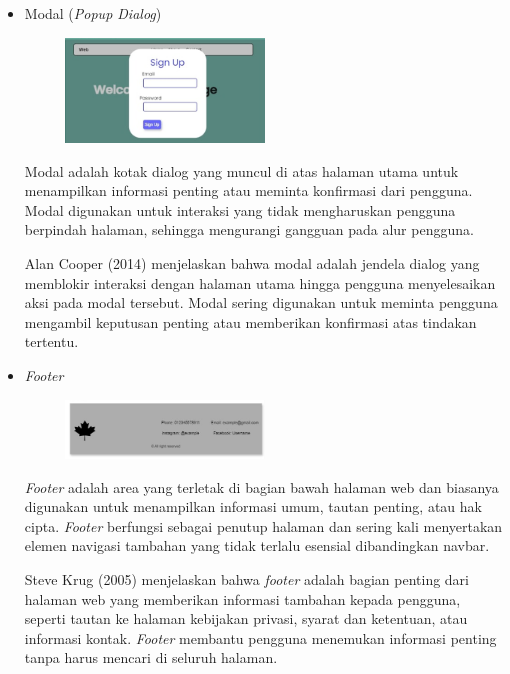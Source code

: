 \documentclass[12pt]{article}
\begin{document}
\begin{itemize}
\item Modal (\emph{Popup Dialog})
\begin{figure}[h] %
    \centering
    \includegraphics[width=0.5\textwidth]{asset/popUp.png }
\end{figure}
\par Modal adalah kotak dialog yang muncul di atas halaman utama untuk menampilkan informasi penting atau meminta konfirmasi dari pengguna. Modal digunakan untuk interaksi yang tidak mengharuskan pengguna berpindah halaman, sehingga mengurangi gangguan pada alur pengguna.
\par Alan Cooper (2014) menjelaskan bahwa modal adalah jendela dialog yang memblokir interaksi dengan halaman utama hingga pengguna menyelesaikan aksi pada modal tersebut. Modal sering digunakan untuk meminta pengguna mengambil keputusan penting atau memberikan konfirmasi atas tindakan tertentu.

\item \emph{Footer}
\begin{figure}[h] %
    \centering
    \includegraphics[width=0.5\textwidth]{asset/footer.png }
\end{figure}
\par \emph{Footer} adalah area yang terletak di bagian bawah halaman web dan biasanya digunakan untuk menampilkan informasi umum, tautan penting, atau hak cipta. \emph{Footer} berfungsi sebagai penutup halaman dan sering kali menyertakan elemen navigasi tambahan yang tidak terlalu esensial dibandingkan navbar.
\par Steve Krug (2005) menjelaskan bahwa \emph{footer} adalah bagian penting dari halaman web yang memberikan informasi tambahan kepada pengguna, seperti tautan ke halaman kebijakan privasi, syarat dan ketentuan, atau informasi kontak. \emph{Footer} membantu pengguna menemukan informasi penting tanpa harus mencari di seluruh halaman.

\end{itemize}
\end{document}
